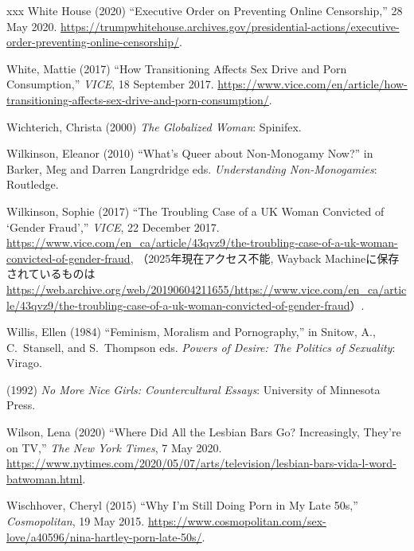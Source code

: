 \documentclass[]{jlreq} \usepackage{mystyle}
\begin{document}
\begin{thebibliography}{xxx}
{White House} (2020) ``Executive Order on Preventing Online Censorship,'' 28
  May 2020.
  \url{https://trumpwhitehouse.archives.gov/presidential-actions/executive-order-preventing-online-censorship/}.

White, Mattie (2017) ``How Transitioning Affects Sex Drive and Porn
  Consumption,'' \emph{VICE}, 18 September 2017.
  \url{https://www.vice.com/en/article/how-transitioning-affects-sex-drive-and-porn-consumption/}.

Wichterich, Christa (2000)  \textit{ The Globalized Woman}: Spinifex.

Wilkinson, Eleanor (2010) ``What's Queer about Non-Monogamy Now?'' in Barker,
  Meg and Darren Langrdridge eds.   \textit{ Understanding Non-Monogamies}:
  Routledge.

Wilkinson, Sophie (2017) ``The Troubling Case of a UK Woman Convicted of
  `Gender Fraud','' \emph{VICE}, 22 December 2017.
  \url{https://www.vice.com/en_ca/article/43qvz9/the-troubling-case-of-a-uk-woman-convicted-of-gender-fraud},
  （2025年現在アクセス不能, Wayback
  Machineに保存されているものは\url{https://web.archive.org/web/20190604211655/https://www.vice.com/en_ca/article/43qvz9/the-troubling-case-of-a-uk-woman-convicted-of-gender-fraud}）.

Willis, Ellen (1984) ``Feminism, Moralism and Pornography,'' in Snitow, A.,
  C.~Stansell, and S.~Thompson eds.   \textit{ Powers of Desire: The Politics
  of Sexuality}: Virago.

 \bysame{}  (1992)  \textit{ No More Nice Girls: Countercultural Essays}:
  University of Minnesota Press.

Wilson, Lena (2020) ``Where Did All the Lesbian Bars Go? Increasingly, They're
  on TV,'' \emph{The New York Times}, 7 May 2020.
  \url{https://www.nytimes.com/2020/05/07/arts/television/lesbian-bars-vida-l-word-batwoman.html}.

Wischhover, Cheryl (2015) ``Why I'm Still Doing Porn in My Late 50s,''
  \emph{Cosmopolitan}, 19 May 2015.
  \url{https://www.cosmopolitan.com/sex-love/a40596/nina-hartley-porn-late-50s/}.


\end{thebibliography}
\end{document}
